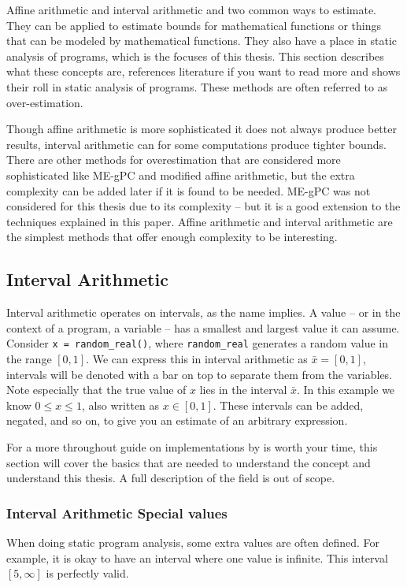 Affine arithmetic and interval arithmetic and two common ways to estimate. They can be applied to estimate bounds for mathematical functions or things that can be modeled by mathematical functions. They also have a place in static analysis of programs, which is the focuses of this thesis. This section describes what these concepts are, references literature if you want to read more and shows their roll in static analysis of programs. These methods are often referred to as over-estimation.

Though affine arithmetic is more sophisticated it does not always produce better results, interval arithmetic can for some computations produce tighter bounds. There are other methods for overestimation that are considered more sophisticated like ME-gPC \cite{src:MEgPC} and modified affine arithmetic, but the extra complexity can be added later if it is found to be needed. ME-gPC was not considered for this thesis due to its complexity -- but it is a good extension to the techniques explained in this paper. Affine arithmetic and interval arithmetic are the simplest methods that offer enough complexity to be interesting.

\subsection{Interval Arithmetic}
Interval arithmetic operates on intervals, as the name implies. A value -- or in the context of a program, a variable -- has a smallest and largest value it can assume. Consider \verb`x = random_real()`, where \verb`random_real` generates a random value in the range $[0, 1]$. We can express this in interval arithmetic as $\bar{x} = [0, 1]$, intervals will be denoted with a bar on top to separate them from the variables. Note especially that the true value of $x$ lies in the interval $\bar{x}$. In this example we know $0 \leq x \leq 1$, also written as $x \in [0, 1]$. These intervals can be added, negated, and so on, to give you an estimate of an arbitrary expression.

For a more throughout guide on implementations  by \citeauthor{src:affAri} is worth your time, this section will cover the basics that are needed to understand the concept and understand this thesis. A full description of the field is out of scope.
\subsubsection{Interval Arithmetic Special values}
When doing static program analysis, some extra values are often defined. For example, it is okay to have an interval where one value is infinite. This interval $[5, \infty]$ is perfectly valid.

